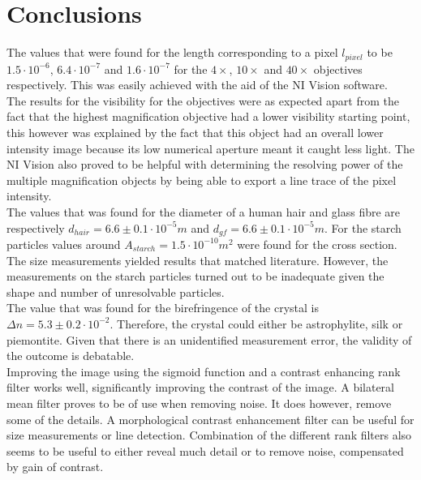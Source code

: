 \section{Conclusions}

The values that were found  for the length corresponding to a pixel $l_{pixel}$ to be $1.5\cdot10^{-6}$, $6.4\cdot10^{-7}$ and $1.6\cdot10^{-7}$ for the $4\times$, $10\times$ and $40\times$ objectives respectively. This was easily achieved with the aid of the NI Vision software.\\
The results for the visibility for the objectives were as expected apart from the fact that the highest magnification objective had a lower visibility starting point, this however was explained by the fact that this object had an overall lower intensity image because its low numerical aperture meant it caught less light. The NI Vision also proved to be helpful with determining the resolving power of the multiple magnification objects by being able to export a line trace of the pixel intensity.\\
The values that was found for the diameter of a human hair and glass fibre are respectively $d_{hair}=6.6\pm0.1\cdot10^{-5} m$ and $d_{gf}=6.6\pm0.1\cdot10^{-5} m$. For the starch particles values around $A_{starch}=1.5\cdot10^{-10} m^2$ were found for the cross section. The size measurements yielded results that matched literature. However, the measurements on the starch particles turned out to be inadequate given the shape and number of unresolvable particles.\\
The value that was found for the birefringence of the crystal is $\Delta n = 5.3\pm0.2\cdot10^{-2}$. Therefore, the crystal could either be astrophylite, silk or piemontite. Given that there is an unidentified measurement error, the validity of the outcome is debatable.\\
Improving the image using the sigmoid function and a contrast enhancing rank filter works well, significantly improving the contrast of the image. A bilateral mean filter proves to be of use when removing noise. It does however, remove some of the details. A morphological contrast enhancement filter can be useful for size measurements or line detection. Combination of the different rank filters also seems to be useful to either reveal much detail or to remove noise, compensated by gain of contrast.  \\



